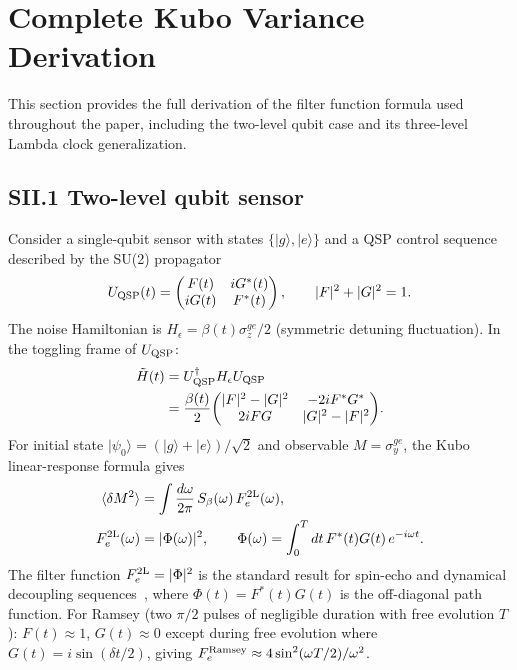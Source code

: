 \documentclass[aps,pra,twocolumn,superscriptaddress,longbibliography]{revtex4-2}
\newcommand{\be}{\begin{equation}}
\newcommand{\ee}{\end{equation}}
\begin{document}
\section{Complete Kubo Variance Derivation}
\label{supp:kubo_full}

This section provides the full derivation of the filter function formula used
throughout the paper, including the two-level qubit case and its three-level
Lambda clock generalization.

\subsection*{SII.1 Two-level qubit sensor}

Consider a single-qubit sensor with states $\{|g\rangle, |e\rangle\}$ and a
QSP control sequence described by the SU(2) propagator
\be
  U_{\rm QSP}(t) = \begin{pmatrix} F(t) & iG^*(t) \\ iG(t) & F^*(t) \end{pmatrix},
  \qquad |F|^2 + |G|^2 = 1.
\ee
The noise Hamiltonian is $H_\epsilon = \beta(t)\sigma_z^{ge}/2$ (symmetric detuning
fluctuation).  In the toggling frame of $U_{\rm QSP}$:
\begin{align}
  \tilde{H}(t) &= U_{\rm QSP}^\dagger H_\epsilon U_{\rm QSP} \\
  &= \frac{\beta(t)}{2}\!\begin{pmatrix}
      |F|^2-|G|^2 & -2iF^*G^* \\
      2iFG        & |G|^2-|F|^2
    \end{pmatrix}\!.
\end{align}
For initial state $|\psi_0\rangle = (|g\rangle+|e\rangle)/\sqrt{2}$ and
observable $M = \sigma_y^{ge}$, the Kubo linear-response formula gives
\begin{align}
  \langle\delta M^2\rangle
  &= \int \frac{d\omega}{2\pi}\, S_\beta(\omega)\, F_e^{\rm 2L}(\omega), \\
  F_e^{\rm 2L}(\omega) &= |\Phi(\omega)|^2,
  \qquad \Phi(\omega) = \int_0^T dt\, F^*(t)G(t)\,e^{-i\omega t}.
  \label{eq:Fe_2level}
\end{align}
The filter function $F_e^{\rm 2L} = |\Phi|^2$ is the standard result for
spin-echo and dynamical decoupling sequences~\cite{Biercuk2011}, where
$\Phi(t) = F^*(t)G(t)$ is the off-diagonal path function.
For Ramsey (two $\pi/2$ pulses of negligible duration with free evolution $T$):
$F(t)\approx 1$, $G(t)\approx 0$ except during free evolution where $G(t) = i\sin(\delta t/2)$,
giving $F_e^{\rm Ramsey} \approx 4\sin^2(\omega T/2)/\omega^2$.
\end{document}
